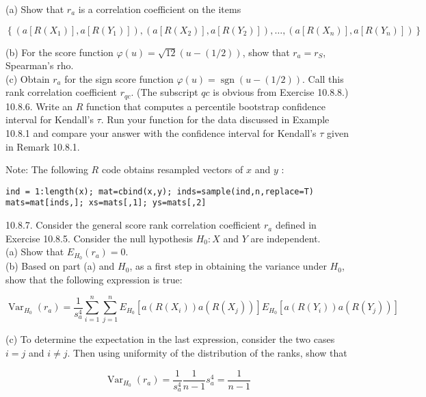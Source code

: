 (a) Show that $r_{a}$ is a correlation coefficient on the items

$$
\left\{\left(a\left[R\left(X_{1}\right)\right], a\left[R\left(Y_{1}\right)\right]\right),\left(a\left[R\left(X_{2}\right)\right], a\left[R\left(Y_{2}\right)\right]\right), \ldots,\left(a\left[R\left(X_{n}\right)\right], a\left[R\left(Y_{n}\right)\right]\right)\right\}
$$

(b) For the score function $\varphi(u)=\sqrt{12}(u-(1 / 2))$, show that $r_{a}=r_{S}$, Spearman's rho.\\
(c) Obtain $r_{a}$ for the sign score function $\varphi(u)=\operatorname{sgn}(u-(1 / 2))$. Call this rank correlation coefficient $r_{q c}$. (The subscript $q c$ is obvious from Exercise 10.8.8.)\\
10.8.6. Write an $R$ function that computes a percentile bootstrap confidence interval for Kendall's $\tau$. Run your function for the data discussed in Example 10.8.1 and compare your answer with the confidence interval for Kendall's $\tau$ given in Remark 10.8.1.

Note: The following $R$ code obtains resampled vectors of $x$ and $y$ :

\begin{verbatim}
ind = 1:length(x); mat=cbind(x,y); inds=sample(ind,n,replace=T)
mats=mat[inds,]; xs=mats[,1]; ys=mats[,2]
\end{verbatim}

10.8.7. Consider the general score rank correlation coefficient $r_{a}$ defined in Exercise 10.8.5. Consider the null hypothesis $H_{0}: X$ and $Y$ are independent.\\
(a) Show that $E_{H_{0}}\left(r_{a}\right)=0$.\\
(b) Based on part (a) and $H_{0}$, as a first step in obtaining the variance under $H_{0}$, show that the following expression is true:

$$
\operatorname{Var}_{H_{0}}\left(r_{a}\right)=\frac{1}{s_{a}^{4}} \sum_{i=1}^{n} \sum_{j=1}^{n} E_{H_{0}}\left[a\left(R\left(X_{i}\right)\right) a\left(R\left(X_{j}\right)\right)\right] E_{H_{0}}\left[a\left(R\left(Y_{i}\right)\right) a\left(R\left(Y_{j}\right)\right)\right]
$$

(c) To determine the expectation in the last expression, consider the two cases $i=j$ and $i \neq j$. Then using uniformity of the distribution of the ranks, show that


\begin{equation*}
\operatorname{Var}_{H_{0}}\left(r_{a}\right)=\frac{1}{s_{a}^{4}} \frac{1}{n-1} s_{a}^{4}=\frac{1}{n-1} \tag{10.8.17}
\end{equation*}


